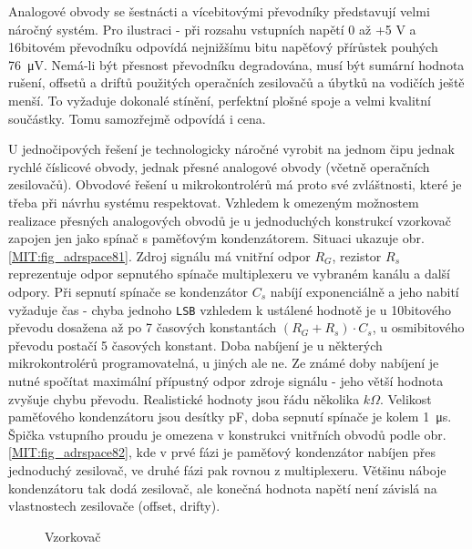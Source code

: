       Analogové obvody se šestnácti a vícebitovými převodníky představují velmi náročný systém. Pro 
      ilustraci - při rozsahu vstupních napětí 0 až +5 V a 16bitovém převodníku odpovídá nejnižšímu 
      bitu napěťový přírůstek pouhých \SI{76}{\micro\volt}. Nemá-li být přesnost převodníku 
      degradována, musí být sumární hodnota rušení, offsetů a driftů použitých operačních 
      zesilovačů a úbytků na vodičích ještě  menší. To vyžaduje dokonalé stínění, perfektní plošné 
      spoje a velmi kvalitní součástky. Tomu samozřejmě odpovídá i cena.
      
      U jednočipových řešení je technologicky náročné vyrobit na jednom čipu jednak rychlé 
      číslicové obvody, jednak přesné analogové obvody (včetně operačních zesilovačů). Obvodové 
      řešení u mikrokontrolérů má  proto své zvláštnosti, které je třeba při návrhu systému 
      respektovat. Vzhledem k omezeným možnostem  realizace přesných analogových obvodů je u 
      jednoduchých konstrukcí vzorkovač zapojen jen jako spínač s paměťovým kondenzátorem. Situaci 
      ukazuje obr. \ref{MIT:fig_adrspace81}. Zdroj signálu má vnitřní odpor \(R_G\), rezistor 
      \(R_s\) reprezentuje odpor sepnutého spínače multiplexeru ve vybraném kanálu a další 
      odpory. Při sepnutí spínače se kondenzátor \(C_s\) nabíjí exponenciálně a jeho nabití 
      vyžaduje čas - chyba jednoho \texttt{LSB} vzhledem k ustálené hodnotě je u 10bitového převodu 
      dosažena až po 7 časových konstantách \((R_G + R_s)\cdot C_s\), u osmibitového převodu 
      postačí 5 časových konstant. Doba nabíjení je u některých mikrokontrolérů programovatelná, u 
      jiných ale ne. Ze známé doby nabíjení je nutné spočítat maximální přípustný odpor zdroje 
      signálu - jeho větší hodnota zvyšuje chybu převodu. Realistické hodnoty jsou řádu několika 
      \(k\Omega\). Velikost paměťového kondenzátoru jsou desítky pF, doba sepnutí spínače je kolem 
      \SI{1}{\micro\second}. Špička vstupního proudu je omezena v konstrukci vnitřních obvodů podle 
      obr. \ref{MIT:fig_adrspace82}, kde v prvé fázi je paměťový kondenzátor nabíjen přes 
      jednoduchý zesilovač, ve druhé fázi pak rovnou z multiplexeru. Většinu náboje kondenzátoru 
      tak dodá zesilovač, ale konečná hodnota napětí není závislá na vlastnostech zesilovače 
      (offset, drifty).
       
      \begin{figure}[ht!]
        \centering  
          {}             
          {}              
        \caption{Vzorkovač}
        \label{MIT:fig_sbernice8182}
      \end{figure}
        
